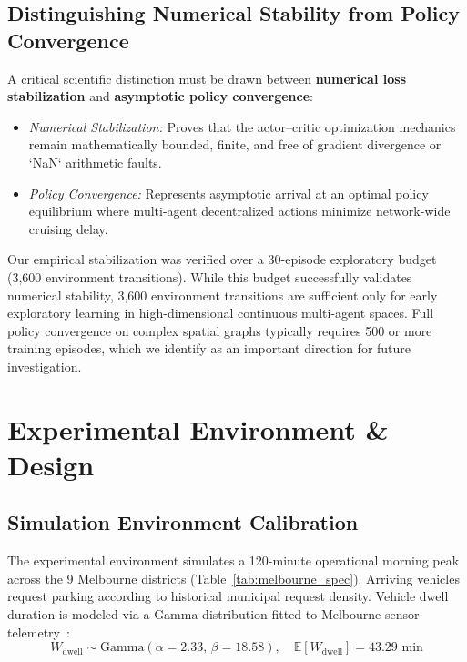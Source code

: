 \documentclass[journal]{IEEEtran}
\begin{document}
\subsection{Distinguishing Numerical Stability from Policy Convergence}
A critical scientific distinction must be drawn between \textbf{numerical loss stabilization} and \textbf{asymptotic policy convergence}:
\begin{itemize}
    \item \textit{Numerical Stabilization:} Proves that the actor--critic optimization mechanics remain mathematically bounded, finite, and free of gradient divergence or `NaN` arithmetic faults.
    \item \textit{Policy Convergence:} Represents asymptotic arrival at an optimal policy equilibrium where multi-agent decentralized actions minimize network-wide cruising delay.
\end{itemize}
Our empirical stabilization was verified over a 30-episode exploratory budget (3,600 environment transitions). While this budget successfully validates numerical stability, 3,600 environment transitions are sufficient only for early exploratory learning in high-dimensional continuous multi-agent spaces. Full policy convergence on complex spatial graphs typically requires 500 or more training episodes, which we identify as an important direction for future investigation.

\section{Experimental Environment \& Design}
\label{sec:env_design}

\subsection{Simulation Environment Calibration}
The experimental environment simulates a 120-minute operational morning peak across the 9 Melbourne districts (Table~\ref{tab:melbourne_spec}). Arriving vehicles request parking according to historical municipal request density. Vehicle dwell duration is modeled via a Gamma distribution fitted to Melbourne sensor telemetry~\cite{melbourne2024sensors}:
\begin{equation}
W_{\text{dwell}} \sim \text{Gamma}(\alpha = 2.33, \, \beta = 18.58), \quad \mathbb{E}[W_{\text{dwell}}] = 43.29\text{ min}
\end{equation}
\end{document}
